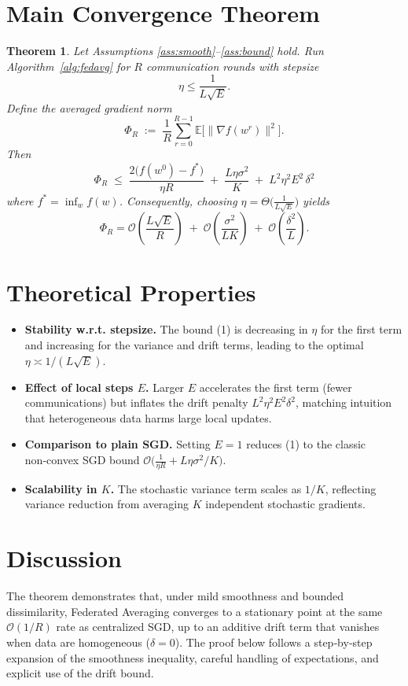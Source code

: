 \documentclass{article}
\newtheorem{theorem}{Theorem}
\newcommand{\EE}{\mathbb{E}}
\begin{document}
\section*{Main Convergence Theorem}
\begin{theorem}\label{thm:main}
Let Assumptions \ref{ass:smooth}–\ref{ass:bound} hold.
Run Algorithm~\ref{alg:fedavg} for $R$ communication rounds with stepsize
\[
    \eta \le \frac{1}{L\sqrt{E}} .
\]
Define the averaged gradient norm
\[
    \Phi_R\;:=\;\frac{1}{R}\sum_{r=0}^{R-1}\EE\big[\|\nabla f(w^{r})\|^{2}\big].
\]
Then
\[
\boxed{
\Phi_R\;\le\;
\frac{2\big(f(w^{0})-f^{*}\big)}{\eta R}
\;+\;
\frac{L\eta\sigma^{2}}{K}
\;+\;
L^{2}\eta^{2}E^{2}\,\delta^{2}
}
\tag{1}
\]
where $f^{*}=\inf_{w}f(w)$.
Consequently, choosing $\eta = \Theta\!\big(\frac{1}{L\sqrt{E}}\big)$ yields
\[
    \Phi_R = \mathcal O\!\left(\frac{L\sqrt{E}}{R}\right)
    \;+\;\mathcal O\!\left(\frac{\sigma^{2}}{LK}\right)
    \;+\;\mathcal O\!\left(\frac{\delta^{2}}{L}\right).
\]
\end{theorem}

\section*{Theoretical Properties}
\begin{itemize}
    \item \textbf{Stability w.r.t. stepsize.} The bound (1) is decreasing in $\eta$ for the first term and increasing for the variance and drift terms, leading to the optimal $\eta\asymp 1/(L\sqrt{E})$.
    \item \textbf{Effect of local steps $E$.} Larger $E$ accelerates the first term (fewer communications) but inflates the drift penalty $L^{2}\eta^{2}E^{2}\delta^{2}$, matching intuition that heterogeneous data harms large local updates.
    \item \textbf{Comparison to plain SGD.} Setting $E=1$ reduces (1) to the classic non‑convex SGD bound $\mathcal O\!\big(\frac{1}{\eta R}+L\eta\sigma^{2}/K\big)$.
    \item \textbf{Scalability in $K$.} The stochastic variance term scales as $1/K$, reflecting variance reduction from averaging $K$ independent stochastic gradients.
\end{itemize}

\section*{Discussion}
The theorem demonstrates that, under mild smoothness and bounded dissimilarity, Federated Averaging converges to a stationary point at the same $\mathcal O(1/R)$ rate as centralized SGD, up to an additive drift term that vanishes when data are homogeneous ($\delta=0$). The proof below follows a step‑by‑step expansion of the smoothness inequality, careful handling of expectations, and explicit use of the drift bound.
\end{document}
